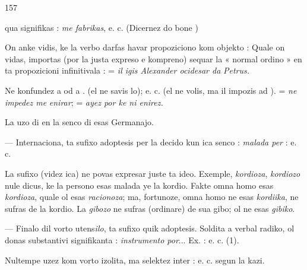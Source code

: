 \begin{VUpage}[161]{157}

\VUcontinue
qua signifikas : \textit{me fabrikas}, e. c. (Dicernez do bone \nl
{})

On anke vidis, ke la verbo  darfas havar propoziciono\nl
kom objekto :  Quale on\nl
vidas, importas (por la justa expreso e kompreno) sequar\nl
la « normal ordino » en ta propozicioni infinitivala : \nl
{} = \textit{il igis Alexander ocidesar da}\nl
\textit{Petrus.}

Ne konfundez  a  od a . \cc
{} (el ne savis lo);\nl
{} e. c. (el ne volis, ma il impozis ad\nl
{}).  = \textit{ne impedez me}\nl
\textit{enirar};  = \textit{ayez por ke ni enirez.}

La uzo di  en la senco di  esas Germanajo.

 --- Internaciona, ta sufixo adoptesis per la decido kun ica senco : \textit{malada per} : \nl
{}\cc
{}\nl
{} e. c.

La sufixo  (videz ica) ne povas expresar juste ta ideo.\nl
Exemple, \textit{kordioza}, \textit{kordiozo} nule dicus, ke la persono esas\nl
malada ye la kordio. Fakte omna homo esas \textit{kordioza}, quale\nl
ol esas \textit{racionoza}; ma, fortunoze, omna homo ne esas \textit{kordiika},\nl
ne sufras de la kordio. La \textit{gibozo} ne sufras (ordinare) de sua\nl
gibo; ol ne esas \textit{gibiko}.

 --- Finalo dil vorto utens\textit{ilo}, ta sufixo quik adoptesis.\nl
Soldita a verbal radiko, ol donas substantivi signifikanta :\nl
\textit{instrumento por}... Ex. : \nl
{} e. c. (1).

Nultempe uzez  kom vorto izolita, ma selektez inter :\nl
{} e. c. segun la kazi.\parplein
\end{VUpage}

